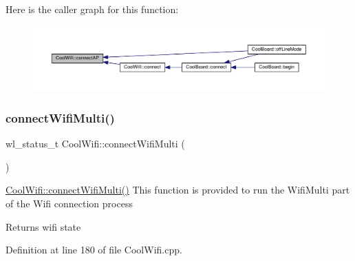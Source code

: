 Here is the caller graph for this function\+:\nopagebreak
\begin{figure}[H]
\begin{center}
\leavevmode
\includegraphics[width=350pt]{d7/d29/class_cool_wifi_a7c857f27161782f5ef1d62d552aff971_icgraph}
\end{center}
\end{figure}
\mbox{\label{class_cool_wifi_a419de92d738f14b7444cf822b3ab0070}} 
\subsubsection{\texorpdfstring{connect\+Wifi\+Multi()}{connectWifiMulti()}}
{\footnotesize\ttfamily wl\+\_\+status\+\_\+t Cool\+Wifi\+::connect\+Wifi\+Multi (\begin{DoxyParamCaption}{ }\end{DoxyParamCaption})}

\hyperlink{class_cool_wifi_a419de92d738f14b7444cf822b3ab0070}{Cool\+Wifi\+::connect\+Wifi\+Multi()} This function is provided to run the Wifi\+Multi part of the Wifi connection process

\begin{DoxyReturn}{Returns}
wifi state 
\end{DoxyReturn}


Definition at line 180 of file Cool\+Wifi.\+cpp.


